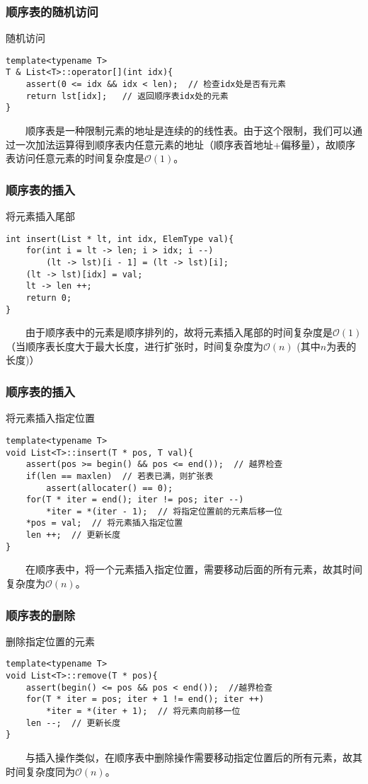 \documentclass{beamer}
\begin{document}
	\begin{frame}[fragile]\frametitle{顺序表的随机访问}
		\begin{block}{随机访问}
\begin{verbatim}
template<typename T>
T & List<T>::operator[](int idx){
    assert(0 <= idx && idx < len);  // 检查idx处是否有元素
    return lst[idx];   // 返回顺序表idx处的元素
}
\end{verbatim}
		\end{block}
		\ \ \ \ 顺序表是一种限制元素的地址是连续的的线性表。由于这个限制，我们可以通过一次加法运算得到顺序表内任意元素的地址（顺序表首地址+偏移量），故顺序表访问任意元素的时间复杂度是$\mathcal{O}(1)$。
	\end{frame}

	\begin{frame}[fragile]\frametitle{顺序表的插入}
		\begin{block}{将元素插入尾部}
\begin{verbatim}
int insert(List * lt, int idx, ElemType val){
    for(int i = lt -> len; i > idx; i --)
        (lt -> lst)[i - 1] = (lt -> lst)[i];
    (lt -> lst)[idx] = val;
    lt -> len ++;
    return 0;
}
\end{verbatim}
		\end{block}
		\ \ \ \ 由于顺序表中的元素是顺序排列的，故将元素插入尾部的时间复杂度是$\mathcal{O}(1)$（当顺序表长度大于最大长度，进行扩张时，时间复杂度为$\mathcal{O}(n)$ (其中$n$为表的长度)）
	\end{frame}

	\begin{frame}[fragile]\frametitle{顺序表的插入}
		\begin{block}{将元素插入指定位置}
\begin{verbatim}
template<typename T>
void List<T>::insert(T * pos, T val){
    assert(pos >= begin() && pos <= end());  // 越界检查
    if(len == maxlen)  // 若表已满，则扩张表
        assert(allocater() == 0);
    for(T * iter = end(); iter != pos; iter --)
        *iter = *(iter - 1);  // 将指定位置前的元素后移一位
    *pos = val;  // 将元素插入指定位置
    len ++;  // 更新长度
}
\end{verbatim}
		\end{block}
		\ \ \ \ 在顺序表中，将一个元素插入指定位置，需要移动后面的所有元素，故其时间复杂度为$\mathcal{O}(n)$。
	\end{frame}

	\begin{frame}[fragile]\frametitle{顺序表的删除}
		\begin{block}{删除指定位置的元素}
\begin{verbatim}
template<typename T>
void List<T>::remove(T * pos){
    assert(begin() <= pos && pos < end());  //越界检查
    for(T * iter = pos; iter + 1 != end(); iter ++)
        *iter = *(iter + 1);  // 将元素向前移一位
    len --;  // 更新长度
}
\end{verbatim}
		\end{block}
	\ \ \ \ 与插入操作类似，在顺序表中删除操作需要移动指定位置后的所有元素，故其时间复杂度同为$\mathcal{O}(n)$。
	\end{frame}
\end{document}
